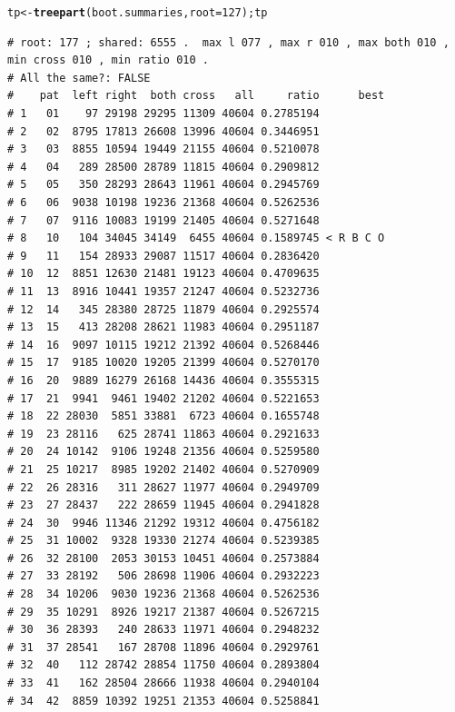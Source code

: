 \documentclass{article}\usepackage[]{graphicx}\usepackage[]{color}
\makeatletter
\newcommand{\hlnum}[1]{\textcolor[rgb]{0.686,0.059,0.569}{#1}}%
\newcommand{\hlstd}[1]{\textcolor[rgb]{0.345,0.345,0.345}{#1}}%
\newcommand{\hlkwb}[1]{\textcolor[rgb]{0.69,0.353,0.396}{#1}}%
\newcommand{\hlkwc}[1]{\textcolor[rgb]{0.333,0.667,0.333}{#1}}%
\newcommand{\hlkwd}[1]{\textcolor[rgb]{0.737,0.353,0.396}{\textbf{#1}}}%
\newenvironment{kframe}{%
 \def\at@end@of@kframe{}%
 \ifinner\ifhmode%
  \def\at@end@of@kframe{\end{minipage}}%
  \begin{minipage}{\columnwidth}%
 \fi\fi%
 \def\FrameCommand##1{\hskip\@totalleftmargin \hskip-\fboxsep
 \colorbox{shadecolor}{##1}\hskip-\fboxsep
     \hskip-\linewidth \hskip-\@totalleftmargin \hskip\columnwidth}%
 \MakeFramed {\advance\hsize-\width
   \@totalleftmargin\z@ \linewidth\hsize
   \@setminipage}}%
 {\par\unskip\endMakeFramed%
 \at@end@of@kframe}
\newenvironment{knitrout}{}{} %
\makeatother
\begin{document}
\begin{knitrout}\scriptsize
{}\color{fgcolor}\begin{kframe}
\begin{alltt}
\hlstd{tp} \hlkwb{<-} \hlkwd{treepart}\hlstd{(boot.summaries,}\hlkwc{root}\hlstd{=}\hlnum{127}\hlstd{) ; tp}
\end{alltt}
\begin{verbatim}
# root: 177 ; shared: 6555 .  max l 077 , max r 010 , max both 010 , min cross 010 , min ratio 010 . 
# All the same?: FALSE
#    pat  left right  both cross   all     ratio      best
# 1   01    97 29198 29295 11309 40604 0.2785194          
# 2   02  8795 17813 26608 13996 40604 0.3446951          
# 3   03  8855 10594 19449 21155 40604 0.5210078          
# 4   04   289 28500 28789 11815 40604 0.2909812          
# 5   05   350 28293 28643 11961 40604 0.2945769          
# 6   06  9038 10198 19236 21368 40604 0.5262536          
# 7   07  9116 10083 19199 21405 40604 0.5271648          
# 8   10   104 34045 34149  6455 40604 0.1589745 < R B C O
# 9   11   154 28933 29087 11517 40604 0.2836420          
# 10  12  8851 12630 21481 19123 40604 0.4709635          
# 11  13  8916 10441 19357 21247 40604 0.5232736          
# 12  14   345 28380 28725 11879 40604 0.2925574          
# 13  15   413 28208 28621 11983 40604 0.2951187          
# 14  16  9097 10115 19212 21392 40604 0.5268446          
# 15  17  9185 10020 19205 21399 40604 0.5270170          
# 16  20  9889 16279 26168 14436 40604 0.3555315          
# 17  21  9941  9461 19402 21202 40604 0.5221653          
# 18  22 28030  5851 33881  6723 40604 0.1655748          
# 19  23 28116   625 28741 11863 40604 0.2921633          
# 20  24 10142  9106 19248 21356 40604 0.5259580          
# 21  25 10217  8985 19202 21402 40604 0.5270909          
# 22  26 28316   311 28627 11977 40604 0.2949709          
# 23  27 28437   222 28659 11945 40604 0.2941828          
# 24  30  9946 11346 21292 19312 40604 0.4756182          
# 25  31 10002  9328 19330 21274 40604 0.5239385          
# 26  32 28100  2053 30153 10451 40604 0.2573884          
# 27  33 28192   506 28698 11906 40604 0.2932223          
# 28  34 10206  9030 19236 21368 40604 0.5262536          
# 29  35 10291  8926 19217 21387 40604 0.5267215          
# 30  36 28393   240 28633 11971 40604 0.2948232          
# 31  37 28541   167 28708 11896 40604 0.2929761          
# 32  40   112 28742 28854 11750 40604 0.2893804          
# 33  41   162 28504 28666 11938 40604 0.2940104          
# 34  42  8859 10392 19251 21353 40604 0.5258841          

\end{verbatim}
\end{kframe}
\end{knitrout}
\end{document}
